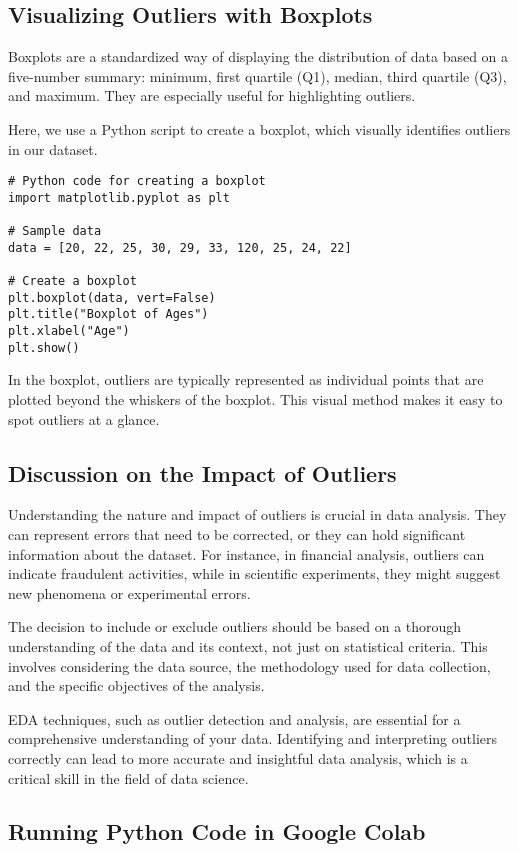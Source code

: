 \documentclass[a4paper,12pt]{book}
\begin{document}
\subsection{Visualizing Outliers with Boxplots}
Boxplots are a standardized way of displaying the distribution of data based on a five-number summary: minimum, first quartile (Q1), median, third quartile (Q3), and maximum. They are especially useful for highlighting outliers.

Here, we use a Python script to create a boxplot, which visually identifies outliers in our dataset.

\begin{verbatim}
# Python code for creating a boxplot
import matplotlib.pyplot as plt

# Sample data
data = [20, 22, 25, 30, 29, 33, 120, 25, 24, 22]

# Create a boxplot
plt.boxplot(data, vert=False)
plt.title("Boxplot of Ages")
plt.xlabel("Age")
plt.show()
\end{verbatim}

In the boxplot, outliers are typically represented as individual points that are plotted beyond the whiskers of the boxplot. This visual method makes it easy to spot outliers at a glance.

\subsection{Discussion on the Impact of Outliers}
Understanding the nature and impact of outliers is crucial in data analysis. They can represent errors that need to be corrected, or they can hold significant information about the dataset. For instance, in financial analysis, outliers can indicate fraudulent activities, while in scientific experiments, they might suggest new phenomena or experimental errors.

The decision to include or exclude outliers should be based on a thorough understanding of the data and its context, not just on statistical criteria. This involves considering the data source, the methodology used for data collection, and the specific objectives of the analysis.

EDA techniques, such as outlier detection and analysis, are essential for a comprehensive understanding of your data. Identifying and interpreting outliers correctly can lead to more accurate and insightful data analysis, which is a critical skill in the field of data science. 

\subsection{Running Python Code in Google Colab}
\end{document}
